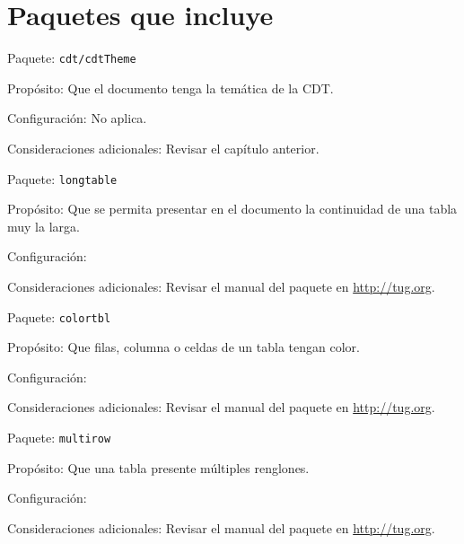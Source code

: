 
\section{Paquetes que incluye}

\begin{Cdescription}
	\item[Paquete:] {\tt cdt/cdtTheme}
	\item[Propósito:] Que el documento tenga la temática de la CDT.
	\item[Configuración:] No aplica.
	\item[Consideraciones adicionales:] Revisar el capítulo anterior.
\end{Cdescription}

\begin{Cdescription}
	\item[Paquete:] {\tt longtable}%
	\item[Propósito:] Que se permita presentar en el documento la continuidad de una tabla muy la larga.
	\item[Configuración:] 
	\item[Consideraciones adicionales:] Revisar el manual del paquete en \url{http://tug.org}.
\end{Cdescription}

\begin{Cdescription}
	\item[Paquete:] {\tt colortbl}%
	\item[Propósito:] Que filas, columna o celdas de un tabla tengan color.
	\item[Configuración:] 
	\item[Consideraciones adicionales:] Revisar el manual del paquete en \url{http://tug.org}.
\end{Cdescription}

\begin{Cdescription}
	\item[Paquete:] {\tt multirow}%
	\item[Propósito:] Que una tabla presente múltiples renglones.
	\item[Configuración:] 
	\item[Consideraciones adicionales:] Revisar el manual del paquete en \url{http://tug.org}.
\end{Cdescription}


